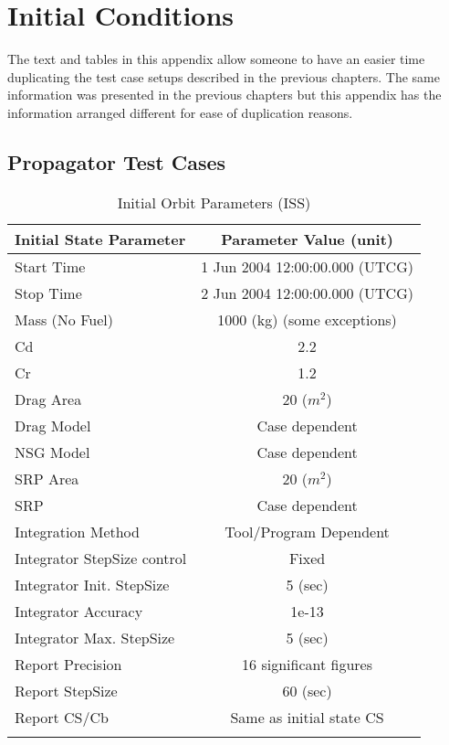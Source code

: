 \chapter{Initial Conditions}
\label{Ch:initConds}

The text and tables in this appendix allow someone to have an easier
time duplicating the test case setups described in the previous
chapters. The same information was presented in the previous
chapters but this appendix has the information arranged
different for ease of duplication reasons.\\

\section{Propagator Test Cases}
\label{Sec:initCondsProp}

\begin{table}[htbp!]
\centering \caption{Initial Orbit Parameters (ISS)}
      \begin{tabular}{lc}
      \hline\hline
            Initial State Parameter & Parameter Value (unit)\\
            \hline
            Start Time & 1 Jun 2004 12:00:00.000 (UTCG)\\
            Stop Time & 2 Jun 2004 12:00:00.000 (UTCG)\\
            
            Mass (No Fuel) & 1000 (kg) (some exceptions)\\
            Cd & 2.2\\
            Cr & 1.2\\
            Drag Area & 20 ($m^2$)\\
            Drag Model & Case dependent\\
            NSG Model & Case dependent\\
            SRP Area & 20 ($m^2$)\\
            SRP & Case dependent\\
            Integration Method & Tool/Program Dependent\\
            Integrator StepSize control & Fixed\\
            Integrator Init. StepSize & 5 (sec)\\
            Integrator Accuracy & 1e-13\\
            Integrator Max. StepSize & 5 (sec)\\
            Report Precision & 16 significant figures\\
            Report StepSize & 60 (sec)\\
            Report CS/Cb & Same as initial state CS\\
      \hline\hline
      \label{Table: InitStateISS}
\end{tabular}
\end{table}

